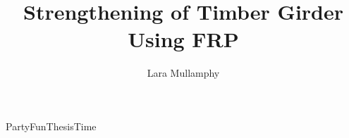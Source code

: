 \documentclass[10pt,a4paper]{report}
\title{Strengthening of Timber Girder Using FRP}
\author{Lara Mullamphy}
\begin{document}
	\maketitle
	PartyFunThesisTime\cite{nolkrantz_electroporation_2001}


\end{document}
